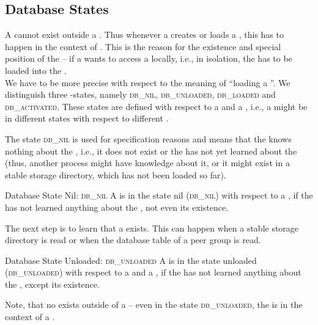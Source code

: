 \documentclass[a4paper, 12pt]{book}
\begin{document}
\subsection{Database States}

\newcommand{\dbstateNIL}{{\normalfont\textsc{db\_nil}}\xspace}
\newcommand{\dbstateUNLOADED}{{\normalfont\textsc{db\_unloaded}}\xspace}
\newcommand{\dbstateLOADED}{{\normalfont\textsc{db\_loaded}}\xspace}
\newcommand{\dbstateACTIVATED}{{\normalfont\textsc{db\_activated}}\xspace}


A  cannot exist outside a . Thus whenever a  creates or loads a ,
this has to happen in the context of . This is the
reason for the existence and special position of the  -- if a  wants to access a 
locally, i.e., in isolation, the  has to be loaded into
the .\\
%
We have to be more precise with respect to the meaning of ``loading a
''. We distinguish three -states, namely
\dbstateNIL, \dbstateUNLOADED, \dbstateLOADED and
\dbstateACTIVATED. These states are defined with respect to a 
and a , i.e., a  might be in different states with
respect to different .

The state \dbstateNIL is used for specification
reasons and means that the  knows nothing about the
, i.e., it does not exist or the  has not yet
learned about the  (thus, another process might have
knowledge about it, or it might exist in a stable storage directory,
which has not been loaded so far).
%
\begin{definition*}{Database State Nil: \dbstateNIL}
  A  is in the state nil (\dbstateNIL) with respect to a
  , if the  has not learned anything about the
  , not even its existence. 
\end{definition*}
%
The next step is to learn that a  exists. This can happen
when a stable storage directory is read or when the database table of
a peer group is read. 
%
\begin{definition*}{Database State Unloaded: \dbstateUNLOADED}
  A  is in the state unloaded (\dbstateUNLOADED) with
  respect to a  and a , if the  has not learned
  anything about the , except its existence.
\end{definition*}
%
Note, that no  exists outside of a  --
even in the state \dbstateUNLOADED, the  is
in the context of a .
\end{document}
